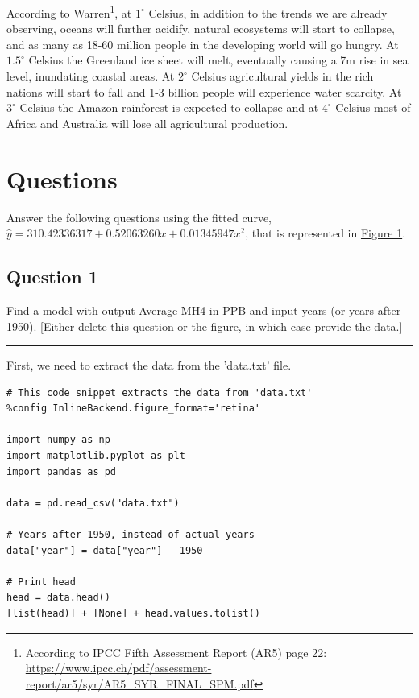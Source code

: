 \documentclass[11pt]{article}
\begin{document}
According to Warren\footnote{According to IPCC Fifth Assessment Report (AR5) page 22: \url{https://www.ipcc.ch/pdf/assessment-report/ar5/syr/AR5\_SYR\_FINAL\_SPM.pdf}}, at \(1^{\circ}\) Celsius, in addition to the trends
we are already observing, oceans will further acidify, natural
ecosystems will start to collapse, and as many as 18-60 million people
in the developing world will go hungry.
At \(1.5^{\circ}\) Celsius the Greenland ice sheet will melt, eventually causing
a 7m rise in sea level, inundating coastal areas.
At \(2^{\circ}\) Celsius agricultural yields in the rich nations will start to
fall and 1-3 billion people will experience water scarcity.
At \(3^{\circ}\) Celsius the Amazon rainforest is expected to collapse and at
\(4^{\circ}\) Celsius most of Africa and Australia will lose all agricultural
production.

\section{Questions}
\label{sec:orgc778e3d}

Answer the following questions using the fitted curve,
\(\hat{y} = 310.42336317 + 0.52063260x + 0.01345947x^2\),
that is represented in \hyperref[fig:org6bd9d10]{Figure 1}.

\subsection{Question 1}
\label{sec:org98ee15e}

Find a model with output Average MH4 in PPB and input years (or years after 1950).
[Either delete this question or the figure, in which case provide the data.]

\noindent\rule{\textwidth}{0.5pt}

First, we need to extract the data from the 'data.txt' file.

\begin{verbatim}
# This code snippet extracts the data from 'data.txt'
%config InlineBackend.figure_format='retina'

import numpy as np
import matplotlib.pyplot as plt
import pandas as pd

data = pd.read_csv("data.txt")

# Years after 1950, instead of actual years
data["year"] = data["year"] - 1950

# Print head
head = data.head()
[list(head)] + [None] + head.values.tolist()
\end{verbatim}
\end{document}
